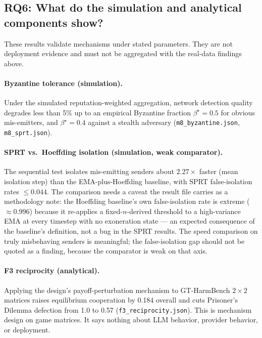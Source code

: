 \documentclass[11pt]{article}
\begin{document}
\subsection{RQ6: What do the simulation and analytical components show?}
\label{sec:rq6}

These results validate mechanisms under stated parameters. They are not deployment evidence and must not be aggregated with the real-data findings above.

\paragraph{Byzantine tolerance (simulation).}
Under the simulated reputation-weighted aggregation, network detection quality degrades less than 5\% up to an empirical Byzantine fraction $\beta^\star = 0.5$ for obvious mis-emitters, and $\beta^\star = 0.4$ against a stealth adversary (\texttt{m8\_byzantine.json}, \texttt{m8\_sprt.json}).

\paragraph{SPRT vs.\ Hoeffding isolation (simulation, weak comparator).}
The sequential test isolates mis-emitting senders about $2.27\times$ faster (mean isolation step) than the EMA-plus-Hoeffding baseline, with SPRT false-isolation rates $\leq 0.044$. The comparison needs a caveat the result file carries as a methodology note: the Hoeffding baseline's own false-isolation rate is extreme ($\approx 0.996$) because it re-applies a fixed-$n$-derived threshold to a high-variance EMA at every timestep with no exoneration state --- an expected consequence of the baseline's definition, not a bug in the SPRT results. The speed comparison on truly misbehaving senders is meaningful; the false-isolation gap should not be quoted as a finding, because the comparator is weak on that axis.

\paragraph{F3 reciprocity (analytical).}
Applying the design's payoff-perturbation mechanism to GT-Harm\-Bench $2\times2$ matrices raises equilibrium cooperation by 0.184 overall and cuts Prisoner's Dilemma defection from 1.0 to 0.57 (\texttt{f3\_reciprocity.json}). This is mechanism design on game matrices. It says nothing about LLM behavior, provider behavior, or deployment.
\end{document}
